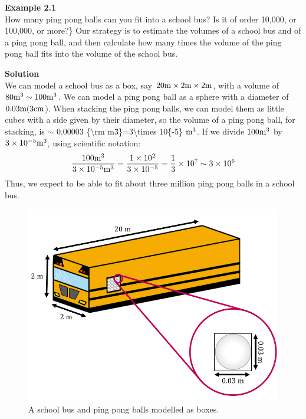 \begin{framed}
\textbf{Example 2.1}\\
How many ping pong balls can you fit into a school bus? Is it of order 10,000, or 100,000, or more?\}
Our strategy is to estimate the volumes of a school bus and of a ping pong ball, and then calculate how many times the volume of the ping pong ball fits into the volume of the school bus.

\begin{framed}
\textbf{Solution}\\
We can model a school bus as a box, say $20 {\rm m}\times 2 {\rm m}\times2 {\rm m}$, with a volume of $80 {\rm m^3}\sim 100 {\rm m^3}$. We can model a ping pong ball as a sphere with a diameter of $0.03 {\rm m} (3 {\rm cm}$). When stacking the ping pong balls, we can model them as little cubes with a side given by their diameter, so the volume of a ping pong ball, for stacking, is $\sim$ 0.00003 \{{\textbackslash}rm m\^3\}=3{\textbackslash}times 10\^\{-5\} ${\rm m^3}$. If we divide $100 {\rm m^3}$ by $3\times 10^{ -5} {\rm m^3}$, using scientific notation:
\begin{equation}
\frac{100 {\rm m^3}}{3\times 10^{-5} {\rm m^3}}=\frac{{1\times 10^{2}}}{{3\times 10^{-5}}}=\frac{1}{3}\times 10^7\sim 3\times 10^6
\end{equation}
Thus, we expect to be able to fit about three million ping pong balls in a school bus.

\begin{figure}[!htbp]
\centering
\includegraphics[width=0.55\linewidth]{files/schoolbusestimate-4f8ae92d39f3ff7dc9e6957709779c22.png}
\caption[]{A school bus and ping pong balls modelled as boxes.}
\label{fig:modelandexperiment:schoolbusestimate}
\end{figure}
\end{framed}
\end{framed}

